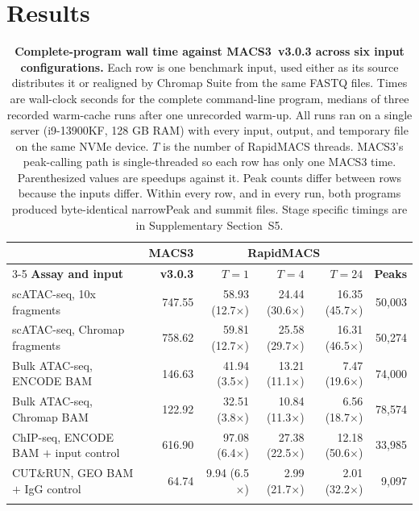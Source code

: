 \documentclass[namedate,webpdf,contemporary,large]{oup-authoring-template}
\begin{document}
\section{Results}
\begin{table}[!t]
\begin{center}
\begin{minipage}{\textwidth}
\caption{\textbf{Complete-program wall time against MACS3~v3.0.3 across six input configurations.} Each row is one benchmark input, used either as its source distributes it or realigned by Chromap Suite from the same FASTQ files. Times are wall-clock seconds for the complete command-line program, medians of three recorded warm-cache runs after one unrecorded warm-up. All runs ran on a single server (i9-13900KF, 128 GB RAM) with every input, output, and temporary file on the same NVMe device. $T$ is the number of RapidMACS threads. MACS3's peak-calling path is single-threaded so each row has only one MACS3 time. Parenthesized values are speedups against it. Peak counts differ between rows because the inputs differ. Within every row, and in every run, both programs produced byte-identical narrowPeak and summit files. Stage specific timings are in Supplementary Section~S5.\label{tab:stages}}
\footnotesize
\setlength{\tabcolsep}{4pt}
\begin{tabular*}{\textwidth}{@{\extracolsep{\fill}}lrrrrr@{}}
\toprule
& \textbf{MACS3} & \multicolumn{3}{c}{\textbf{RapidMACS}} &\\
\cline{3-5}
\textbf{Assay and input} & \textbf{v3.0.3} & $T{=}1$ & $T{=}4$ & $T{=}24$
& \textbf{Peaks}\\
\midrule
scATAC-seq, 10x fragments & 747.55 & 58.93 (12.7$\times$) & 24.44 (30.6$\times$) & 16.35 (45.7$\times$) & 50{,}003\\
scATAC-seq, Chromap fragments & 758.62 & 59.81 (12.7$\times$) & 25.58 (29.7$\times$) & 16.31 (46.5$\times$) & 50{,}274\\[2pt]
Bulk ATAC-seq, ENCODE BAM & 146.63 & 41.94 (3.5$\times$) & 13.21 (11.1$\times$) & 7.47 (19.6$\times$) & 74{,}000\\
Bulk ATAC-seq, Chromap BAM & 122.92 & 32.51 (3.8$\times$) & 10.84 (11.3$\times$) & 6.56 (18.7$\times$) & 78{,}574\\[2pt]
ChIP-seq, ENCODE BAM $+$ input control & 616.90 & 97.08 (6.4$\times$) & 27.38 (22.5$\times$) & 12.18 (50.6$\times$) & 33{,}985\\
CUT\&RUN, GEO BAM $+$ IgG control & 64.74 & 9.94 (6.5$\times$) & 2.99 (21.7$\times$) & 2.01 (32.2$\times$) & 9{,}097\\
\botrule
\end{tabular*}
\end{minipage}
\end{center}
\end{table}
\end{document}
